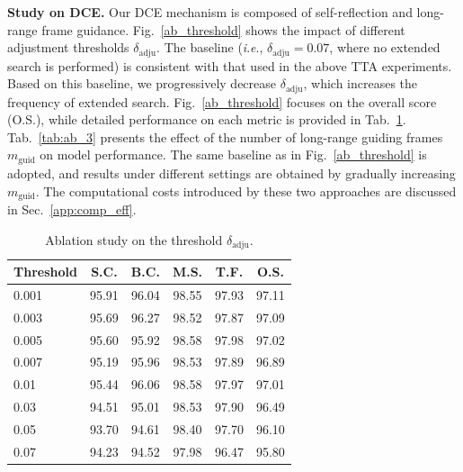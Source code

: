 \documentclass{article}
\theoremstyle{plain}
\theoremstyle{definition}
\theoremstyle{remark}
\newcommand{\ie}{\textit{i}.\textit{e}.}
\begin{document}
\textbf{Study on DCE.}
Our DCE mechanism is composed of self-reflection and long-range frame guidance.
Fig.~\ref{ab_threshold} shows the impact of different adjustment thresholds $\delta_{\mathrm{adju}}$. The baseline (\ie, $\delta_{\mathrm{adju}}=0.07$, where no extended search is performed) is consistent with that used in the above TTA experiments.
Based on this baseline, we progressively decrease $\delta_{\mathrm{adju}}$, which increases the frequency of extended search. Fig.~\ref{ab_threshold} focuses on the overall score (O.S.), while detailed performance on each metric is provided in Tab.~\ref{app:tab_2}.
Tab.~\ref{tab:ab_3} presents the effect of the number of long-range guiding frames $m_{\mathrm{guid}}$ on model performance. The same baseline as in Fig.~\ref{ab_threshold} is adopted, and results under different settings are obtained by gradually increasing $m_{\mathrm{guid}}$.
The computational costs introduced by these two approaches are discussed in Sec.~\ref{app:comp_eff}.


\begin{table}[htbp]
    \centering
    \small
    \caption{Ablation study on the threshold $\delta_\mathrm{adju}$.}
    \label{app:tab_2}
    \begin{tabular}{lccccc} 
        \toprule
        \textbf{Threshold} & \textbf{S.C.} & \textbf{B.C.} & \textbf{M.S.} & \textbf{T.F.} & \textbf{O.S.} \\
        \midrule
        0.001 & 95.91 & 96.04 & 98.55 & 97.93 & 97.11 \\
        0.003 & 95.69 & 96.27 & 98.52 & 97.87 & 97.09 \\
        0.005 & 95.60 & 95.92 & 98.58 & 97.98 & 97.02 \\
        0.007 & 95.19 & 95.96 & 98.53 & 97.89 & 96.89 \\
        0.01  & 95.44 & 96.06 & 98.58 & 97.97 & 97.01 \\
        0.03  & 94.51 & 95.01 & 98.53 & 97.90 & 96.49 \\
        0.05  & 93.70 & 94.61 & 98.40 & 97.70 & 96.10 \\
        0.07  & 94.23 & 94.52 & 97.98 & 96.47 & 95.80 \\
        \bottomrule
    \end{tabular}
\end{table}
\end{document}
